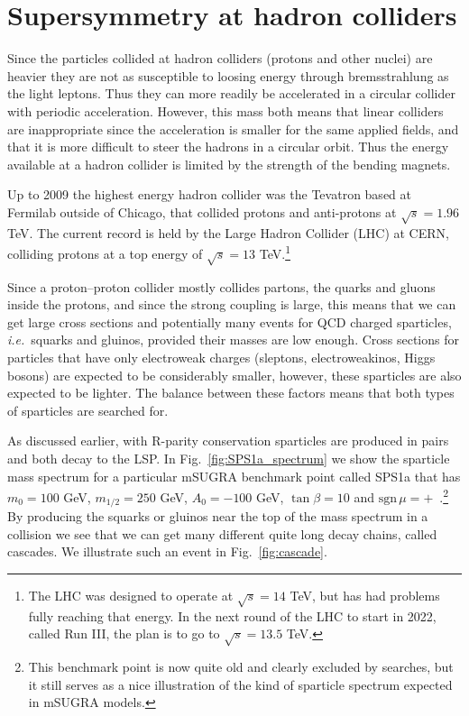 \documentclass[notes.tex]{subfiles}
\begin{document}
\section{Supersymmetry at hadron colliders}
Since the particles collided at hadron colliders (protons and other nuclei) are heavier they are not as susceptible to loosing energy through bremsstrahlung as the light leptons. Thus they can more readily be accelerated in a circular collider with periodic acceleration. However, this mass both means that linear colliders are inappropriate since the acceleration is smaller for the same applied fields, and that it is more difficult to steer the hadrons in a circular orbit. Thus the energy available at a hadron collider is limited by the strength of the bending magnets.

Up to 2009 the highest energy hadron collider was the Tevatron based at Fermilab outside of Chicago, that collided protons and anti-protons at $\sqrt{s}=1.96$ TeV. The current record is held by the Large Hadron Collider (LHC) at CERN, colliding protons at a top energy of $\sqrt{s}=13$ TeV.\footnote{The LHC was designed to operate at $\sqrt{s}=14$ TeV, but has had problems fully reaching that energy. In the next round of the LHC to start in 2022, called Run III, the plan is to go to $\sqrt{s}=13.5$ TeV.}

Since a proton--proton collider mostly collides partons, the quarks and gluons inside the protons, and since the strong coupling is large, this means that we can get large cross sections and potentially many events for QCD charged sparticles, {\it i.e.}\ squarks and gluinos, provided their masses are low enough. Cross sections for particles that have only electroweak charges (sleptons, electroweakinos, Higgs bosons) are expected to be considerably smaller, however, these sparticles are also expected to be lighter. The balance between these factors means that both types of sparticles are searched for.

As discussed earlier, with R-parity conservation sparticles are produced in pairs and both decay to the LSP. In Fig.~\ref{fig:SPS1a_spectrum} we show the sparticle mass spectrum for a particular mSUGRA benchmark point called SPS1a that has $m_0=100$ GeV, $m_{1/2}=250$ GeV, $A_0=-100$ GeV, $\tan\beta=10$ and $\text{sgn}\,\mu=+$~\cite{Allanach:2002nj}.\footnote{This benchmark point is now quite old and clearly excluded by searches, but it still serves as a nice illustration of the kind of sparticle spectrum expected in mSUGRA models.}
By producing the squarks or gluinos near the top of the mass spectrum in a collision we see that we can get many different quite long decay chains, called cascades. We illustrate such an event in  Fig.~\ref{fig:cascade}.
\end{document}
